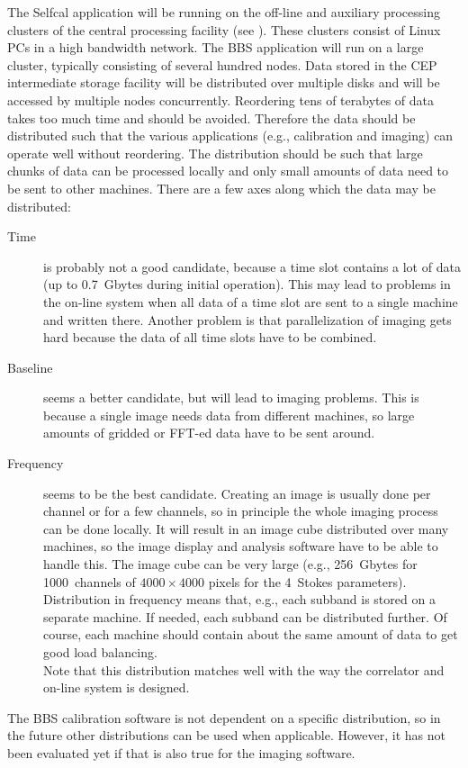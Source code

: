 \documentclass[10pt]{lofar}
\begin{document}
The Selfcal application will be running on the off-line and auxiliary
processing clusters of the central processing facility (see
\cite{LOFAR-ASTRON-ADD-012}). These clusters consist of Linux PCs in a high
bandwidth network. The BBS application will run on a large cluster, typically
consisting of several hundred nodes. Data stored in the CEP intermediate
storage facility will be distributed over multiple disks and will be accessed
by multiple nodes concurrently. Reordering tens of terabytes of data takes too
much time and should be avoided.  Therefore the data should be distributed
such that the various applications (e.g., calibration and imaging) can operate
well without reordering. The distribution should be such that large chunks of
data can be processed locally and only small amounts of data need to be sent
to other machines. There are a few axes along which the data may be
distributed:
\begin{description}
\item [Time] is probably not a good candidate, because a time slot contains a
lot of data (up to 0.7~Gbytes during initial operation). This may lead to
problems in the on-line system when all data of a time slot are sent to a
single machine and written there. Another problem is that parallelization of
imaging gets hard because the data of all time slots have to be combined.
\item [Baseline] seems a better candidate, but will lead to imaging problems. 
This is because a single image needs data from different machines, so large
amounts of gridded or FFT-ed data have to be sent around.
\item [Frequency] seems to be the best candidate. Creating an image is usually
done per channel or for a few channels, so in principle the whole imaging
process can be done locally. It will result in an image cube distributed over
many machines, so the image display and analysis software have to be able to
handle this. The image cube can be very large (e.g., 256~Gbytes for
1000~channels of $4000 \times 4000$ pixels for the 4~Stokes parameters). \\
Distribution in frequency means that, e.g., each subband is stored on a
separate machine.  If needed, each subband can be distributed further. Of
course, each machine should contain about the same amount of data to get good
load balancing. \\ 
Note that this distribution matches well with the way the
correlator and on-line system is designed.
\end{description}
The BBS calibration software is not dependent on a specific distribution, so
in the future other distributions can be used when applicable. However, it has
not been evaluated yet if that is also true for the imaging software.
\end{document}
